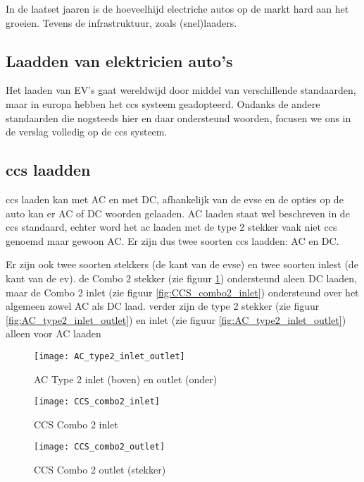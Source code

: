 In de laatset jaaren is de hoeveelhijd electriche autos op de markt hard aan
het groeien. Tevens de infrastruktuur, zoals (snel)laaders. 

\subsection{Laadden van elektricien auto's}

Het laaden van EV's gaat wereldwijd door middel van verschillende standaarden,
maar in europa hebben het \ac{ccs} systeem geadopteerd. Ondanks de andere
standaarden die nogsteeds hier en daar ondersteund woorden, focusen we ons in
de verslag volledig op de \ac{ccs} systeem.

\subsection{\ac{ccs} laadden}

\ac{ccs} laaden kan met AC en met DC, afhankelijk van de \ac{evse} en de opties
op de auto kan er AC of DC woorden gelaaden. AC laaden staat wel beschreven in
de \ac{ccs} standaard, echter word het ac laaden met de type 2 stekker vaak
niet \ac{ccs} genoemd maar gewoon AC. Er zijn dus twee soorten \ac{ccs}
laadden: AC en DC.

Er zijn ook twee soorten stekkers (de kant van de \ac{evse}) en twee soorten
inlest (de kant van de \ac{ev}). de Combo 2 stekker (zie figuur
\ref{fig:CCS_combo2_outlet}) ondersteund aleen DC laaden, maar de Combo 2 inlet
(zie figuur \ref{fig:CCS_combo2_inlet}) ondersteund over het algemeen zowel AC
als DC laad. verder zijn de type 2 stekker (zie figuur
\ref{fig:AC_type2_inlet_outlet}) en inlet (zie figuur
\ref{fig:AC_type2_inlet_outlet}) alleen voor AC laaden

\begin{figure}[h]
    \centering
    \begin{minipage}{0.45\textwidth}
        \centerline{\texttt{[image: AC\_type2\_inlet\_outlet]}}
        \caption{AC Type 2 inlet (boven) en outlet (onder)}
        \label{fig:AC_type2_inlet_outlet}
    \end{minipage}\hfill
    \begin{minipage}{0.45\textwidth}
        \centerline{\texttt{[image: CCS\_combo2\_inlet]}}
        \caption{CCS Combo 2 inlet}
        \label{fig:CCS_combo2_inlet}
        \hfill
        \centerline{\texttt{[image: CCS\_combo2\_outlet]}}
        \caption{CCS Combo 2 outlet (stekker)}
        \label{fig:CCS_combo2_outlet}
    \end{minipage}
\end{figure}

